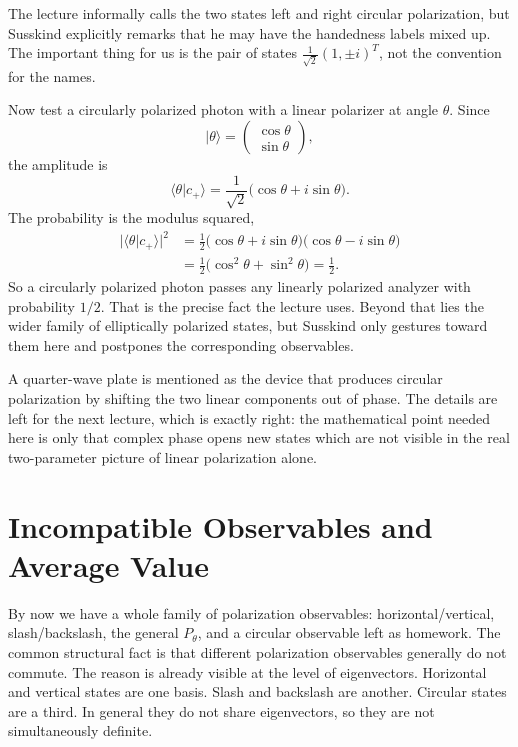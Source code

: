 The lecture informally calls the two states left and right circular polarization, but Susskind explicitly remarks that he may have the handedness labels mixed up. The important thing for us is the pair of states \(\frac1{\sqrt2}(1,\pm i)^T\), not the convention for the names.

Now test a circularly polarized photon with a linear polarizer at angle \(\theta\). Since
\begin{equation}
|\theta\rangle=
\begin{pmatrix}
\cos\theta\\
\sin\theta
\end{pmatrix},
\end{equation}
the amplitude is
\begin{equation}
\langle\theta|c_+\rangle
=
\frac{1}{\sqrt2}\bigl(\cos\theta+i\sin\theta\bigr).
\end{equation}
The probability is the modulus squared,
\begin{align}
|\langle\theta|c_+\rangle|^2
&=
\frac12\bigl(\cos\theta+i\sin\theta\bigr)\bigl(\cos\theta-i\sin\theta\bigr) \\
&=
\frac12\bigl(\cos^2\theta+\sin^2\theta\bigr)
=
\frac12.
\end{align}
So a circularly polarized photon passes any linearly polarized analyzer with probability \(1/2\). That is the precise fact the lecture uses. Beyond that lies the wider family of elliptically polarized states, but Susskind only gestures toward them here and postpones the corresponding observables.

A quarter-wave plate is mentioned as the device that produces circular polarization by shifting the two linear components out of phase. The details are left for the next lecture, which is exactly right: the mathematical point needed here is only that complex phase opens new states which are not visible in the real two-parameter picture of linear polarization alone.

\section{Incompatible Observables and Average Value}

By now we have a whole family of polarization observables: horizontal/vertical, slash/backslash, the general \(P_\theta\), and a circular observable left as homework. The common structural fact is that different polarization observables generally do not commute. The reason is already visible at the level of eigenvectors. Horizontal and vertical states are one basis. Slash and backslash are another. Circular states are a third. In general they do not share eigenvectors, so they are not simultaneously definite.

